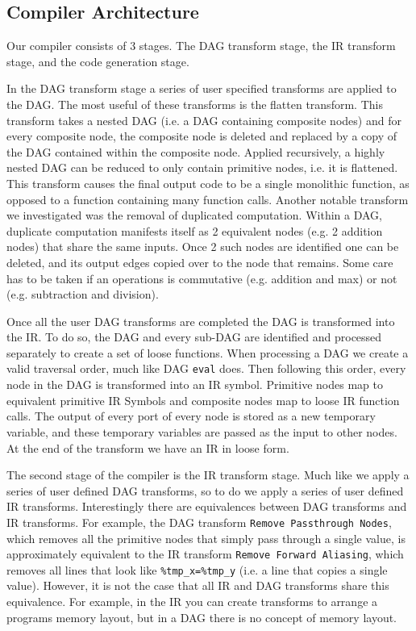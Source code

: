 \subsection{Compiler Architecture}
Our compiler consists of 3 stages.
The DAG transform stage, the IR transform stage, and the code generation stage.

In the DAG transform stage a series of user specified transforms are applied to the DAG.
The most useful of these transforms is the flatten transform.
This transform takes a nested DAG (i.e. a DAG containing composite nodes) and for every composite node, the composite node is deleted and replaced by a copy of the DAG contained within the composite node.
Applied recursively, a highly nested DAG can be reduced to only contain primitive nodes, i.e. it is flattened.
This transform causes the final output code to be a single monolithic function, as opposed to a function containing many function calls.
Another notable transform we investigated was the removal of duplicated computation.
Within a DAG, duplicate computation manifests itself as 2 equivalent nodes (e.g. 2 addition nodes) that share the same inputs.
Once 2 such nodes are identified one can be deleted, and its output edges copied over to the node that remains.
Some care has to be taken if an operations is commutative (e.g. addition and max) or not (e.g. subtraction and division).

Once all the user DAG transforms are completed the DAG is transformed into the IR.
To do so, the DAG and every sub-DAG are identified and processed separately to create a set of loose functions.
When processing a DAG we create a valid traversal order, much like DAG \texttt{eval} does.
Then following this order, every node in the DAG is transformed into an IR symbol.
Primitive nodes map to equivalent primitive IR Symbols and composite nodes map to loose IR function calls.
The output of every port of every node is stored as a new temporary variable, and these temporary variables are passed as the input to other nodes.
At the end of the transform we have an IR in loose form.

The second stage of the compiler is the IR transform stage.
Much like we apply a series of user defined DAG transforms, so to do we apply a series of user defined IR transforms.
Interestingly there are equivalences between DAG transforms and IR transforms.
For example, the DAG transform \texttt{Remove Passthrough Nodes}, which removes all the primitive nodes that simply pass through a single value, is approximately equivalent to the IR transform \texttt{Remove Forward Aliasing}, which removes all lines that look like \lstinline{%tmp_x=%tmp_y} (i.e. a line that copies a single value).
However, it is not the case that all IR and DAG transforms share this equivalence.
For example, in the IR you can create transforms to arrange a programs memory layout, but in a DAG there is no concept of memory layout.

